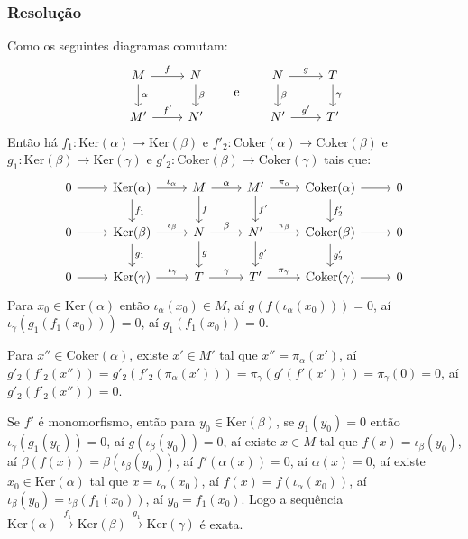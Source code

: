 \documentclass[10pt,a4paper]{article}
\begin{document}
\subsubsection*{Resolução}

Como os seguintes diagramas comutam:
\[
\begin{tikzcd}
M \arrow{r}{f} \arrow{d}{\alpha} & N \arrow{d}{\beta} \\
M' \arrow{r}{f'}                   & N' 
\end{tikzcd}
\quad\quad\text{e}\quad\quad
\begin{tikzcd}
N \arrow{r}{g} \arrow{d}{\beta} & T \arrow{d}{\gamma} \\
N' \arrow{r}{g'}                  & T'                   
\end{tikzcd}
\]
Então há $f_1:\mathrm{Ker}(\alpha)\rightarrow\mathrm{Ker}(\beta)$ e $f'_2:\mathrm{Coker}(\alpha)\rightarrow\mathrm{Coker}(\beta)$ e $g_1:\mathrm{Ker}(\beta)\rightarrow\mathrm{Ker}(\gamma)$ e $g'_2:\mathrm{Coker}(\beta)\rightarrow\mathrm{Coker}(\gamma)$ tais que:
\[
\begin{tikzcd}
0 \arrow{r} & \mathrm{Ker}(\alpha) \arrow{r}{\iota_\alpha} \arrow{d}{f_1} & M \arrow{r}{\alpha} \arrow{d}{f} & M' \arrow{r}{\pi_\alpha} \arrow{d}{f'} & \mathrm{Coker}(\alpha) \arrow{r} \arrow{d}{f'_2} & 0 \\
0 \arrow{r} & \mathrm{Ker}(\beta) \arrow{d}{g_1} \arrow{r}{\iota_\beta}   & N \arrow{d}{g} \arrow{r}{\beta}  & N' \arrow{d}{g'} \arrow{r}{\pi_\beta}  & \mathrm{Coker}(\beta) \arrow{r} \arrow{d}{g'_2}  & 0 \\
0 \arrow{r} & \mathrm{Ker}(\gamma) \arrow{r}{\iota_\gamma}                  & T \arrow{r}{\gamma}                & T' \arrow{r}{\pi_\gamma}                 & \mathrm{Coker}(\gamma) \arrow{r}                   & 0
\end{tikzcd}
\]
Para $x_0\in\mathrm{Ker}(\alpha)$ então $\iota_\alpha(x_0)\in M$, aí $g(f(\iota_\alpha(x_0)))=0$, aí $\iota_\gamma(g_1(f_1(x_0)))=0$, aí $g_1(f_1(x_0))=0$.

\medskip
\noindent
Para $x''\in\mathrm{Coker}(\alpha)$, existe $x'\in M'$ tal que $x''=\pi_\alpha(x')$, aí $g'_2(f'_2(x''))=g'_2(f'_2(\pi_\alpha(x')))=\pi_\gamma(g'(f'(x')))=\pi_\gamma(0)=0$, aí $g'_2(f'_2(x''))=0$.

\medskip
\noindent
Se $f'$ é monomorfismo, então para $y_0\in\mathrm{Ker}(\beta)$, se $g_1(y_0)=0$ então $\iota_\gamma(g_1(y_0))=0$, aí $g(\iota_\beta(y_0))=0$, aí existe $x\in M$ tal que $f(x)=\iota_\beta(y_0)$, aí $\beta(f(x))=\beta(\iota_\beta(y_0))$, aí $f'(\alpha(x))=0$, aí $\alpha(x)=0$, aí existe $x_0\in\mathrm{Ker}(\alpha)$ tal que $x=\iota_\alpha(x_0)$, aí $f(x)=f(\iota_\alpha(x_0))$, aí $\iota_\beta(y_0)=\iota_\beta(f_1(x_0))$, aí $y_0=f_1(x_0)$. Logo a sequência $\mathrm{Ker}(\alpha)\xrightarrow{f_1}\mathrm{Ker}(\beta)\xrightarrow{g_1}\mathrm{Ker}(\gamma)$ é exata.
\end{document}

